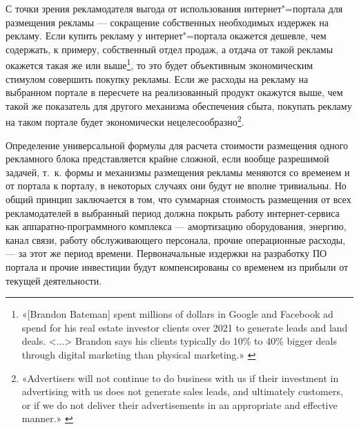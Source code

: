 \documentclass{article}
\begin{document}
С точки зрения рекламодателя выгода от использования интернет"=портала для размещения рекламы — сокращение собственных необходимых издержек на рекламу. Если купить рекламу у интернет"=портала окажется дешевле, чем содержать, к примеру, собственный отдел продаж, а отдача от такой рекламы окажется такая же или выше\footnote{«[Brandon Bateman] spent millions of dollars in Google and Facebook ad spend for his real estate investor clients over 2021 to generate leads and land deals. <...> Brandon says his clients typically do 10\% to 40\% bigger deals through digital marketing than physical marketing.» \cite{roiSEOvsGooglevsFacebook}}, то это будет объективным экономическим стимулом совершить покупку рекламы. Если же расходы на рекламу на выбранном портале в пересчете на реализованный продукт окажутся выше, чем такой же показатель для другого механизма обеспечения сбыта, покупать рекламу на таком портале будет экономически нецелесообразно\footnote{«Advertisers will not continue to do business with us if their investment in advertising with us does not generate sales leads, and ultimately customers, or if we do not deliver their advertisements in an appropriate and effective manner.» \cite{google10K2009}}.

Определение универсальной формулы для расчета стоимости размещения одного рекламного блока представляется крайне сложной, если вообще разрешимой задачей, т.~к. формы и механизмы размещения рекламы меняются со временем и от портала к порталу, в некоторых случаях они будут не вполне тривиальны. Но общий принцип заключается в том, что суммарная стоимость размещения от всех рекламодателей в выбранный период должна покрыть работу интернет-сервиса как аппаратно-программного комплекса — амортизацию оборудования, энергию, канал связи, работу обслуживающего персонала, прочие операционные расходы, — за этот же период времени. Первоначальные издержки на разработку ПО портала и прочие инвестиции будут компенсированы со временем из прибыли от текущей деятельности.
\end{document}
